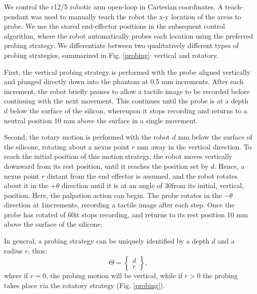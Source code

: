 We control the r12/5 robotic arm open-loop in Cartesian coordinates. A teach-pendant was used to manually teach the 
robot the x-y location of the areas to probe. We use the stored end-effector positions in the subsequent 
control algorithm, where the robot automatically probes each location using the preferred probing strategy. 
We differentiate between two qualitatively different types of probing strategies, summarized in 
Fig. \ref{probing}: vertical and rotatory. 

First, the vertical probing strategy is performed with the probe aligned vertically and plunged 
directly down into the phantom at 0.5 mm increments. After each increment, the robot briefly pauses to allow a 
tactile image to be recorded before continuing with the next movement. This continues until the probe is at a 
depth $d$ below the surface of the silicon, whereupon it stops recording and returns to a neutral position 10 mm 
above the surface in a single movement.

Second, the rotary motion is performed with the robot $d$ mm below the surface of the silicone, rotating about 
a nexus point $r$ mm away in the vertical direction. To reach the initial position of this motion strategy, 
the robot moves vertically downward from its rest position, until it reaches the position set by $d$. Hence, a 
nexus point $r$ distant from the end effector is assumed, and the robot rotates about it in the $+\theta$ 
direction until it is at an angle of 30\degree from its initial, vertical, position. Here, the palpation action can 
begin. The probe rotates in the $-\theta$ direction at 1\degree increments, recording a tactile image after each step. 
Once the probe has rotated of 60\degree it stops recording, and returns to its rest position 10 mm above the 
surface of the silicone. 

In general, a probing strategy can be uniquely identified by a depth $d$ and a radius $r$, thus:
\begin{equation}
\Theta = \begin{Bmatrix}d\\ r\end{Bmatrix},
\end{equation} 
where if $r=0$, the probing motion will be vertical, while if $r>0$ the probing takes place via the 
rotatory strategy (Fig. \ref{probing}).




